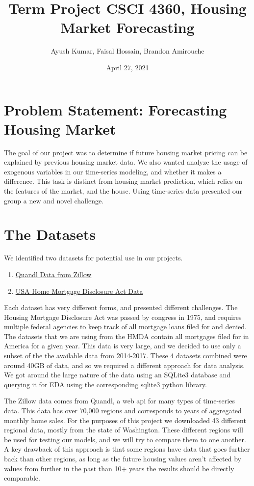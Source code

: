 \documentclass{article}
\title{Term Project CSCI 4360, Housing Market Forecasting}
\author{Ayush Kumar, Faisal Hossain, Brandon Amirouche}
\date{April 27, 2021}
\begin{document}
	\maketitle
	\tableofcontents
	\newpage
	
	\section{Problem Statement: Forecasting Housing Market}
	
	The goal of our project was to determine if future housing market pricing can be explained by 
	previous housing market data. We also wanted analyze the usage of exogenous variables in our time-series 
	modeling, and whether it makes a difference. This task is distinct from housing market prediction, which 
	relies on the features of the market, and the house. Using time-series data presented our group a new 
	and novel challenge. 

	\section{The Datasets}
	
	We identified two datasets for potential use in our projects. 
	
	\begin{enumerate}
		\item  \href{https://www.quandl.com/databases/ZILLOW/data}{Quandl Data from Zillow}
		\item \href{https://www.consumerfinance.gov/data-research/hmda/historic-data/?geo=nationwide&records=all-records&field_descriptions=labels}{USA Home Mortgage Disclosure Act Data}
	\end{enumerate}

	Each dataset has very different forms, and presented different challenges. The Housing Mortgage Disclosure Act was passed 
	by congress in 1975, and requires multiple federal agencies to keep track of all mortgage loans filed for and 
	denied. The datasets that we are using from the HMDA contain all mortgages filed for in America for a given year. 
	This data is very large, and we decided to use only a subset of the the available data from 2014-2017. These 
	4 datasets combined were around 40GB of data, and so we required a different approach for data analysis. We 
	got around the large nature of the data using an SQLite3 database and querying it for EDA using the corresponding 
	sqlite3 python library. 
	
	The Zillow data comes from Quandl, a web api for many types of time-series data. This data has over 70,000 regions
	and corresponds to years of aggregated monthly home sales. For the purposes of this project we downloaded 43 different 
	regional data, mostly from the state of Washington. These different regions will be used for testing our models, and we will try 
	to compare them to one another. A key drawback of this approach is that some regions have data that goes further back 
	than other regions, as long as the future housing values aren't affected by values from further in the past than 10+ years
	the results should be directly comparable. 
	
\end{document}
